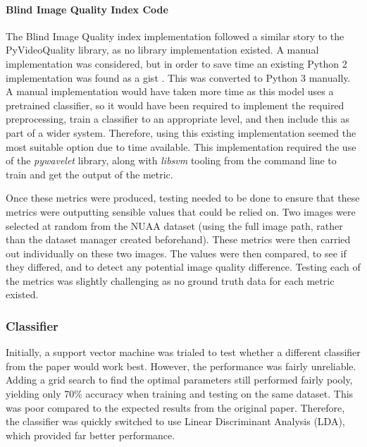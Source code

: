 \documentclass[11pt,a4paper]{article}
\begin{document}
            \paragraph{Blind Image Quality Index Code}
            The Blind Image Quality index implementation followed a similar story to the PyVideoQuality library, as no library implementation existed. A manual implementation was considered, but in order to save time an existing Python 2 implementation was found as a gist \cite{BIQIImplementation}.
            This was converted to Python 3 manually. A manual implementation would have taken more time as this model uses a pretrained classifier, so it would have been required to implement the required preprocessing, train a classifier to an appropriate level,
            and then include this as part of a wider system. Therefore, using this existing implementation seemed the most suitable option due to time available. This implementation required the use of the \emph{pywavelet} library, along with \emph{libsvm} tooling from the command line to train and get the output of the metric.

            

            Once these metrics were produced, testing needed to be done to ensure that these metrics were outputting sensible values that could be relied on.
            Two images were selected at random from the NUAA dataset (using the full image path, rather than the dataset manager created beforehand). These metrics
            were then carried out individually on these two images. The values were then compared, to see if they differed, and to detect any potential image quality difference. 
            Testing each of the metrics was slightly challenging as no ground truth data for each metric existed.


        \subsubsection{Classifier}
            Initially, a support vector machine was trialed to test whether a different classifier from the paper \cite{ImageQualityAssessmentTest} would work best. However,
            the performance was fairly unreliable. Adding a grid search to find the optimal parameters still performed fairly pooly, yielding only 70\% accuracy when training and testing on the same dataset. This was poor compared to the expected results from the original paper. Therefore, the classifier was quickly switched to
            use Linear Discriminant Analysis (LDA), which provided far better performance.
\end{document}
